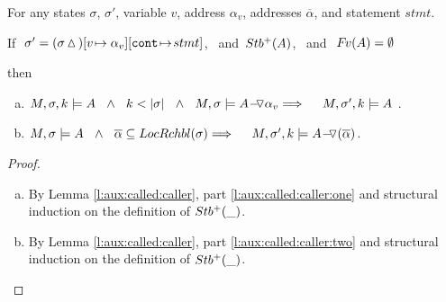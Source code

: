 \begin{lemma}
\label{l:aux:aux:called:caller}

For any   states $\sigma$, $\sigma'$,  variable  $v$,  address  $\alpha_v$,
addresses  $\overline{\alpha}$,     
and statement $stmt$.

\noindent
 If $\  \sigma'= (\sigma \, {\vartriangle}\,)[v\! \mapsto \alpha_v][\mbox{\normalfont{\texttt{cont}}}\!\mapsto\! stmt] $,  \  and\  ${Stb^+( A )}$, \ and \  ${\hspace{-1pt}F\hspace{-1pt}}v(A)=\emptyset$
  
\noindent
then

\begin{enumerate} [a.]
\item
\label{l:aux:aux:called:caller:one}
$\satDAssertFrom M  \sigma k  {A} \ \  \wedge \ \ k < \DepthSt {\sigma} \ \  \wedge \ \ M, \sigma \models   {\PushASLong  {\alpha_v} {A}} 
 \hfill \Longrightarrow  \ \ \  \   \satDAssertFrom M  {\sigma'} k    {A} $ .

 \item
 \label{l:aux:aux:called:caller:two}
 $M, \sigma \models  {A}\   \ \wedge\ \  \overline {\alpha} \subseteq \LRelevantO \sigma
 \hfill \Longrightarrow  \ \ \  \  %
 \satDAssertFrom M  {\sigma'} k   {\PushASLong  {(\overline {\alpha})} {A}}$.


\end{enumerate}
\end{lemma}

\begin{proof} $~ $  %

\begin{enumerate} [a.]
\item
By Lemma \ref{l:aux:called:caller}, part \ref{l:aux:called:caller:one}  and structural induction on the definition of ${Stb^+( \_ )}$.
 \item
 By Lemma \ref{l:aux:called:caller}, part \ref{l:aux:called:caller:two}  and structural induction on the definition of ${Stb^+( \_ )}$.  
\end{enumerate}

\end{proof}